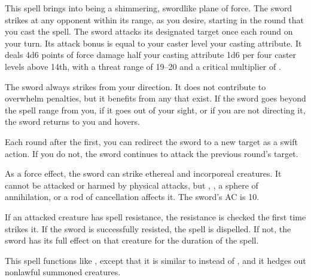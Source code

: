 \spellrng{\rngmed}
\begin{spelleffect}
  This spell brings into being a shimmering, swordlike plane of force. The sword strikes at any opponent within its range, as you desire, starting in the round that you cast the spell. The sword attacks its designated target once each round on your turn. Its attack bonus is equal to your caster level \add your casting attribute. It deals 4d6 points of force damage \add half your casting attribute \add 1d6 per four caster levels above 14th, with a threat range of 19--20 and a critical multiplier of .
  \par The sword always strikes from your direction. It does not contribute to overwhelm penalties, but it benefits from any that exist. If the sword goes beyond the spell range from you, if it goes out of your sight, or if you are not directing it, the sword returns to you and hovers.
\end{spelleffect}
\begin{spellnotes}
  Each round after the first, you can redirect the sword to a new target as a swift action. If you do not, the sword continues to attack the previous round's target.
  \par As a force effect, the sword can strike ethereal and incorporeal creatures. It cannot be attacked or harmed by physical attacks, but , , a sphere of annihilation, or a rod of cancellation affects it. The sword's AC is 10.
  \par If an attacked creature has spell resistance, the resistance is checked the first time  strikes it. If the sword is successfully resisted, the spell is dispelled. If not, the sword has its full effect on that creature for the duration of the spell.
\end{spellnotes}

\begin{spelleffect}
  This spell functions like , except that it is similar to  instead of , and it hedges out nonlawful summoned creatures.
\end{spelleffect}

